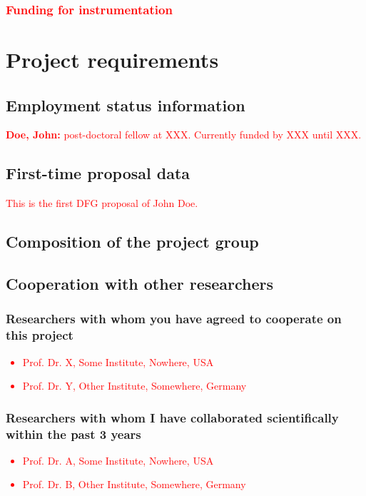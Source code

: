 \documentclass[a4paper,11pt,numbers=noenddot,parskip=half-]{scrreprt}
\begin{document}
\subsubsection{\textcolor{red}{Funding for instrumentation}}
\myblindtext

\section{Project requirements}
\subsection{Employment status information}
\textcolor{red}{\textbf{Doe, John:} post-doctoral fellow at XXX. Currently funded by XXX until XXX.}


\subsection{First-time proposal data}
\textcolor{red}{This is the first DFG proposal of John Doe.}

\subsection{Composition of the project group}
\myblindtext

\subsection{Cooperation with other researchers}
\subsubsection{Researchers with whom you have agreed to cooperate on this project}
\textcolor{red}{
\begin{itemize}[leftmargin=1.1em,topsep=0pt,itemsep=0.0ex,partopsep=0ex,parsep=0ex]
  \item Prof. Dr. X, Some Institute, Nowhere, USA
  \item Prof. Dr. Y, Other Institute, Somewhere, Germany
\end{itemize}
}

\subsubsection{Researchers with whom I have collaborated scientifically within the past 3 years}
\textcolor{red}{
\begin{itemize}[leftmargin=1.1em,topsep=0pt,itemsep=0ex,partopsep=0ex,parsep=0ex]
  \item Prof. Dr. A, Some Institute, Nowhere, USA
  \item Prof. Dr. B, Other Institute, Somewhere, Germany
\end{itemize}
}
\end{document}
